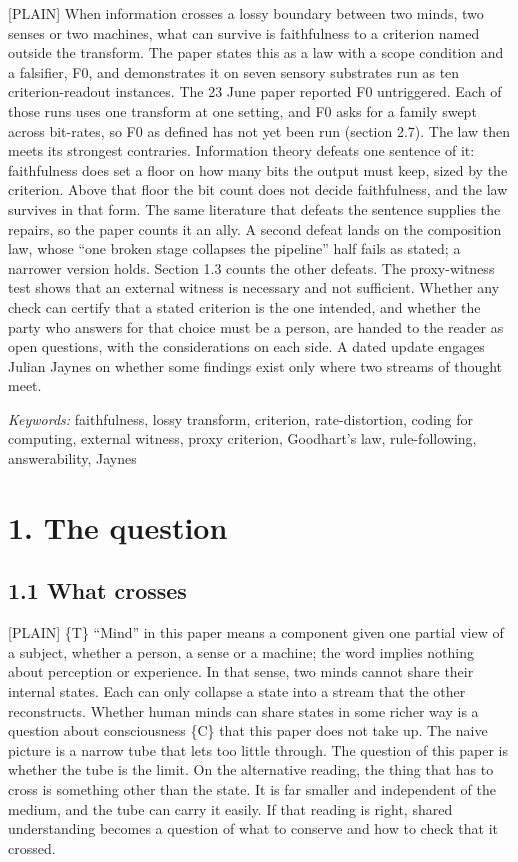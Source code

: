 \documentclass[11pt]{article}
\newcommand{\register}[1]{{\ttfamily\small #1}}
\begin{document}
\register{[PLAIN]} When information crosses a lossy boundary between two minds, two senses or two machines, what can survive is faithfulness to a criterion named outside the transform. The paper states this as a law with a scope condition and a falsifier, F0, and demonstrates it on seven sensory substrates run as ten criterion-readout instances. The 23 June paper reported F0 untriggered. Each of those runs uses one transform at one setting, and F0 asks for a family swept across bit-rates, so F0 as defined has not yet been run (section 2.7). The law then meets its strongest contraries. Information theory defeats one sentence of it: faithfulness does set a floor on how many bits the output must keep, sized by the criterion. Above that floor the bit count does not decide faithfulness, and the law survives in that form. The same literature that defeats the sentence supplies the repairs, so the paper counts it an ally. A second defeat lands on the composition law, whose ``one broken stage collapses the pipeline'' half fails as stated; a narrower version holds. Section 1.3 counts the other defeats. The proxy-witness test shows that an external witness is necessary and not sufficient. Whether any check can certify that a stated criterion is the one intended, and whether the party who answers for that choice must be a person, are handed to the reader as open questions, with the considerations on each side. A dated update engages Julian Jaynes on whether some findings exist only where two streams of thought meet.

\emph{Keywords:} faithfulness, lossy transform, criterion, rate-distortion, coding for computing, external witness, proxy criterion, Goodhart's law, rule-following, answerability, Jaynes

\section*{1. The question}

\subsection*{1.1 What crosses}

\register{[PLAIN]} \{T\} ``Mind'' in this paper means a component given one partial view of a subject, whether a person, a sense or a machine; the word implies nothing about perception or experience. In that sense, two minds cannot share their internal states. Each can only collapse a state into a stream that the other reconstructs. Whether human minds can share states in some richer way is a question about consciousness \{C\} that this paper does not take up. The naive picture is a narrow tube that lets too little through. The question of this paper is whether the tube is the limit. On the alternative reading, the thing that has to cross is something other than the state. It is far smaller and independent of the medium, and the tube can carry it easily. If that reading is right, shared understanding becomes a question of what to conserve and how to check that it crossed.
\end{document}
